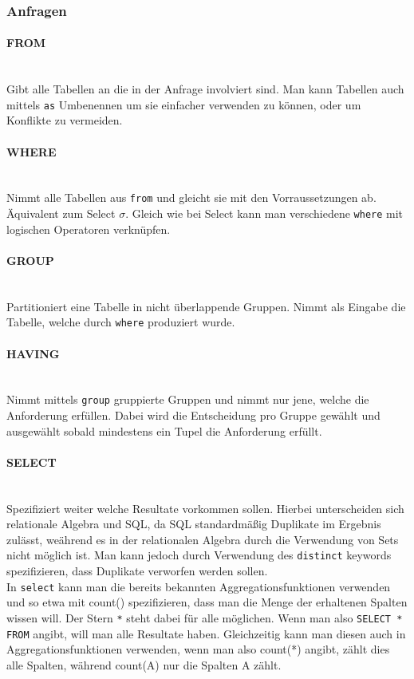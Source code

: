 \documentclass{article}
\newcommand{\paragraphlb}[1]{\paragraph{#1}\mbox{}\\}
\begin{document}
 	\subsubsection{Anfragen}
 	\paragraphlb{FROM}
 	Gibt alle Tabellen an die in der Anfrage involviert sind. Man kann Tabellen auch mittels \verb|as| Umbenennen um sie einfacher verwenden zu können, oder um Konflikte zu vermeiden.
 	\paragraphlb{WHERE}
 	Nimmt alle Tabellen aus \verb|from| und gleicht sie mit den Vorraussetzungen ab. Äquivalent zum Select $\sigma$. Gleich wie bei Select kann man verschiedene \verb|where| mit logischen Operatoren verknüpfen.
 	\paragraphlb{GROUP}
 	Partitioniert eine Tabelle in nicht überlappende Gruppen. Nimmt als Eingabe die Tabelle, welche durch \verb|where| produziert wurde.
 	\paragraphlb{HAVING}
 	Nimmt mittels \verb|group| gruppierte Gruppen und nimmt nur jene, welche die Anforderung erfüllen. Dabei wird die Entscheidung pro Gruppe gewählt und ausgewählt sobald mindestens ein Tupel die Anforderung erfüllt.
 	\paragraphlb{SELECT}
 	Spezifiziert weiter welche Resultate vorkommen sollen. Hierbei unterscheiden sich relationale Algebra und SQL, da SQL standardmäßig Duplikate im Ergebnis zulässt, weährend es in der relationalen Algebra durch die Verwendung von Sets nicht möglich ist. Man kann jedoch durch Verwendung des \verb|distinct| keywords spezifizieren, dass Duplikate verworfen werden sollen. \\
 	In \verb|select| kann man die bereits bekannten Aggregationsfunktionen verwenden und so etwa mit count() spezifizieren, dass man die Menge der erhaltenen Spalten wissen will. Der Stern \verb|*| steht dabei für alle möglichen. Wenn man also \verb|SELECT * FROM| angibt, will man alle Resultate haben. Gleichzeitig kann man diesen auch in Aggregationsfunktionen verwenden, wenn man also count(*) angibt, zählt dies alle Spalten, während count(A) nur die Spalten A zählt. 
\end{document}
